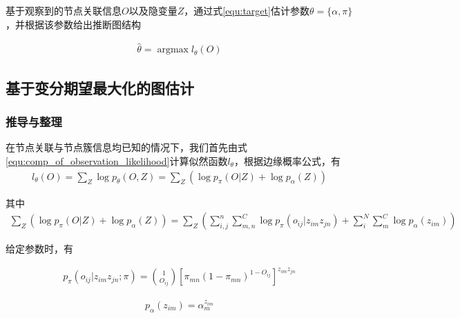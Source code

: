 基于观察到的节点关联信息$O$以及隐变量$Z$，通过式\ref{equ:target}估计参数$\theta=\{\alpha,\pi\}$，并根据该参数给出推断图结构

\begin{equation}\label{equ:target}
  \begin{aligned}
    \hat{\theta}=\mathop{\arg\max} l_\theta(O)
  \end{aligned}
\end{equation}

\subsection{基于变分期望最大化的图估计}

\subsubsection{推导与整理}

在节点关联与节点簇信息均已知的情况下，我们首先由式\ref{equ:comp_of_observation_likelihood}计算似然函数$l_{\theta}$，根据边缘概率公式，有
\begin{equation}\label{equ:comp_of_observation_likelihood}
  \begin{aligned}
    l_\theta(O)=\sum_{Z}\log p_\theta(O,Z)=\sum_Z(\log p_{\pi}(O|Z) +\log p_\alpha(Z))
  \end{aligned}
\end{equation}

其中 
\begin{equation}\label{equ:comp_of_observation_likelihood1}
  \begin{aligned}
\sum_Z(\log p_{\pi}(O|Z)+\log p_\alpha(Z))=\sum_Z(\sum_{i,j}^{n}\sum_{m,n}^C\log p_\pi(o_{ij}|z_{im}z_{jn})
+\sum_{i}^N\sum_m^C\log p_\alpha(z_{im}))
  \end{aligned}
\end{equation}

给定参数时，有 

\begin{equation}\label{equ:comp_of_observation_likelihood2}
  \begin{aligned}
p_\pi(o_{ij}|z_{im}z_{jn};\pi)=\binom{1}{O_{ij}}[\pi_{mn}(1-\pi_{mn})^{1-O_{ij}}]^{ z_{im}z_{jn}}
  \end{aligned}
\end{equation}

\begin{equation}\label{equ:comp_of_observation_likelihood3}
  \begin{aligned}
p_\alpha(z_{im})=\alpha_m^{z_{im}} 
  \end{aligned}
\end{equation}

